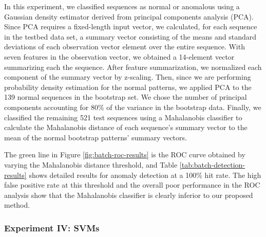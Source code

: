 In this experiment, we classified sequences as normal or anomalous
using a Gaussian density estimator derived from principal components
analysis (PCA).  Since PCA requires a fixed-length input vector, we
calculated, for each sequence in the testbed data set, a summary
vector consisting of the means and standard deviations of each
observation vector element over the entire sequence.  With seven
features in the observation vector, we obtained a 14-element vector
summarizing each the sequence.  After feature summarization, we
normalized each component of the summary vector by z-scaling. Then,
since we are performing probability density estimation for the normal
patterns, we applied PCA to the 139 normal sequences in the bootstrap
set.  We chose the number of principal components accounting for 80\%
of the variance in the bootstrap data. Finally, we classified the
remaining 521 test sequences using a Mahalanobis classifier to calculate 
the Mahalanobis distance of each sequence's summary vector to the mean of
the normal bootstrap patterns' summary vectors.

The green line in Figure \ref{fig:batch-roc-results} is the ROC curve
obtained by varying the Mahalanobis distance threshold, and
Table \ref{tab:batch-detection-results} shows detailed results for
anomaly detection at a 100\% hit rate.  The high false positive rate
at this threshold and the overall poor performance in the ROC analysis
show that the Mahalanobis classifier is clearly inferior to our proposed 
method.


\subsubsection{Experiment IV: SVMs}

